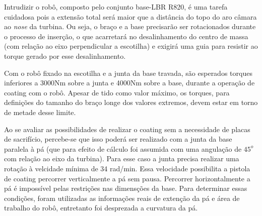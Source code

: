 Intrudizir o robô, composto pelo conjunto base-LBR R820, é uma tarefa cuidadosa
pois a extensão total será maior que a distância do topo do aro câmara ao
\emph{nose} da turbina. Ou seja, o braço e a base precisarão ser rotacionados
durante o processo de inserção, o que acarretará no desalinhamento do centro de
massa (com relação ao eixo perpendicular a escotilha) e exigirá uma guia para
resistir ao torque gerado por esse desalinhamento.

Com o robô fixado na escotilha e a junta da base travada, são esperados torques
inferiores a 3000Nm sobre a junta e 4000Nm sobre a base, durante a operação de
coating com o robô. Apesar de tido como valor máximo, os torques, para
definições do tamanho do braço longe dos valores extremos, devem estar em torno
de metade desse limite.

Ao se avaliar as possibilidades de realizar o coating sem a necessidade de
placas de sacrifício, percebe-se que isso poderá ser realizado com a junta da
base paralela à pá (que para efeito de cálculo foi assumida com uma angulação de 
$45^o$ com relação ao eixo da turbina). Para esse caso a junta precisa realizar
uma rotação à velcidade mínima de 34 rad/min. Essa velocidade possibilita a
pistola de coating percorrer verticalmente a pá sem pausa. Percorrer
horizontalmente a pá é impossível pelas restrições nas dimensções da base. Para
determinar essas condições, foram utilizadas as informações reais de extenção da
pá e área de trabalho do robô, entretanto foi desprezada a curvatura da pá.

